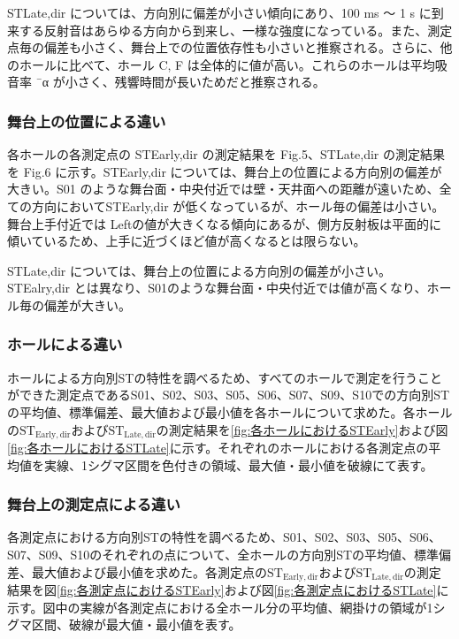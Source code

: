 \documentclass[11pt,a4j]{jreport}
\begin{document}
STLate,dir については、方向別に偏差が小さい傾向にあり、100 ms ～ 1 s に到来する反射音はあらゆる方向から到来し、一様な強度になっている。また、測定点毎の偏差も小さく、舞台上での位置依存性も小さいと推察される。さらに、他のホールに比べて、ホール C, F は全体的に値が高い。これらのホールは平均吸音率 ¯α が小さく、残響時間が長いためだと推察される。


\subsubsection{舞台上の位置による違い}

各ホールの各測定点の STEarly,dir の測定結果を Fig.5、STLate,dir の測定結果を Fig.6 に示す。STEarly,dir については、舞台上の位置による方向別の偏差が大きい。S01 のような舞台面・中央付近では壁・天井面への距離が遠いため、全ての方向においてSTEarly,dir が低くなっているが、ホール毎の偏差は小さい。舞台上手付近では Leftの値が大きくなる傾向にあるが、側方反射板は平面的に傾いているため、上手に近づくほど値が高くなるとは限らない。

STLate,dir については、舞台上の位置による方向別の偏差が小さい。STEalry,dir とは異なり、S01のような舞台面・中央付近では値が高くなり、ホール毎の偏差が大きい。


\subsubsection{ホールによる違い}

ホールによる方向別STの特性を調べるため、すべてのホールで測定を行うことができた測定点であるS01、S02、S03、S05、S06、S07、S09、S10での方向別STの平均値、標準偏差、最大値および最小値を各ホールについて求めた。各ホールの$\mathrm{ST_{Early,dir}}$および$\mathrm{ST_{Late,dir}}$の測定結果を\ref{fig:各ホールにおけるSTEarly}および図\ref{fig:各ホールにおけるSTLate}に示す。それぞれのホールにおける各測定点の平均値を実線、1シグマ区間を色付きの領域、最大値・最小値を破線にて表す。

\subsubsection{舞台上の測定点による違い}

各測定点における方向別STの特性を調べるため、S01、S02、S03、S05、S06、S07、S09、S10のそれぞれの点について、全ホールの方向別STの平均値、標準偏差、最大値および最小値を求めた。各測定点の$\mathrm{ST_{Early,dir}}$および$\mathrm{ST_{Late,dir}}$の測定結果を図\ref{fig:各測定点におけるSTEarly}および図\ref{fig:各測定点におけるSTLate}に示す。図中の実線が各測定点における全ホール分の平均値、網掛けの領域が1シグマ区間、破線が最大値・最小値を表す。
\end{document}
